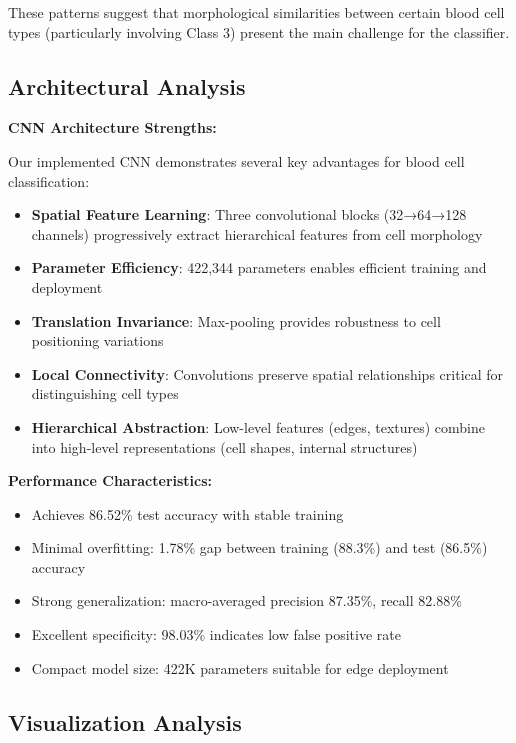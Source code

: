\documentclass[runningheads]{llncs}
\begin{document}
These patterns suggest that morphological similarities between certain blood cell types (particularly involving Class 3) present the main challenge for the classifier.

\subsection{Architectural Analysis}

\textbf{CNN Architecture Strengths:}

Our implemented CNN demonstrates several key advantages for blood cell classification:

\begin{itemize}
    \item \textbf{Spatial Feature Learning}: Three convolutional blocks (32→64→128 channels) progressively extract hierarchical features from cell morphology
    \item \textbf{Parameter Efficiency}: 422,344 parameters enables efficient training and deployment
    \item \textbf{Translation Invariance}: Max-pooling provides robustness to cell positioning variations
    \item \textbf{Local Connectivity}: Convolutions preserve spatial relationships critical for distinguishing cell types
    \item \textbf{Hierarchical Abstraction}: Low-level features (edges, textures) combine into high-level representations (cell shapes, internal structures)
\end{itemize}

\textbf{Performance Characteristics:}
\begin{itemize}
    \item Achieves 86.52\% test accuracy with stable training
    \item Minimal overfitting: 1.78\% gap between training (88.3\%) and test (86.5\%) accuracy
    \item Strong generalization: macro-averaged precision 87.35\%, recall 82.88\%
    \item Excellent specificity: 98.03\% indicates low false positive rate
    \item Compact model size: 422K parameters suitable for edge deployment
\end{itemize}

\subsection{Visualization Analysis}
\end{document}
